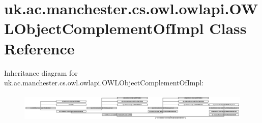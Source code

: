 \hypertarget{classuk_1_1ac_1_1manchester_1_1cs_1_1owl_1_1owlapi_1_1_o_w_l_object_complement_of_impl}{\section{uk.\-ac.\-manchester.\-cs.\-owl.\-owlapi.\-O\-W\-L\-Object\-Complement\-Of\-Impl Class Reference}
\label{classuk_1_1ac_1_1manchester_1_1cs_1_1owl_1_1owlapi_1_1_o_w_l_object_complement_of_impl}
}
Inheritance diagram for uk.\-ac.\-manchester.\-cs.\-owl.\-owlapi.\-O\-W\-L\-Object\-Complement\-Of\-Impl\-:\begin{figure}[H]
\begin{center}
\leavevmode
\includegraphics[height=1.355932cm]{classuk_1_1ac_1_1manchester_1_1cs_1_1owl_1_1owlapi_1_1_o_w_l_object_complement_of_impl}
\end{center}
\end{figure}
